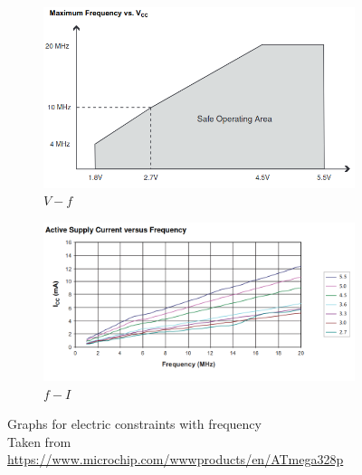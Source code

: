 \begin{arabicparts}
    \begin{figure}[!hp]
        \centering
        \begin{subfigure}[b]{0.83\textwidth}
            \centering
            \includegraphics[width=\textwidth]{fig/voltfreq.png}
            \caption{$V-f$}
            \label{subfig:voltfreq}
        \end{subfigure}
        \begin{subfigure}[b]{0.9\textwidth}
            \centering
            \includegraphics[width=\textwidth]{fig/currfreq.png}
            \caption{$f-I$}
            \label{subfig:currfreq}
        \end{subfigure}        
        \captionsetup{justification=centering}
        \caption{Graphs for electric constraints with frequency \\
        Taken from \url{https://www.microchip.com/wwwproducts/en/ATmega328p}}
        \label{fig:elecfreq}
    \end{figure}


\end{arabicparts}